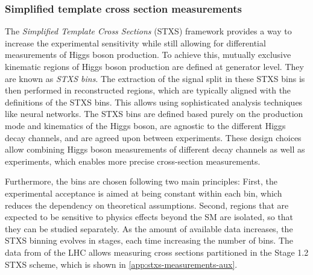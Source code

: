 \subsubsection{Simplified template cross section measurements}
The \emph{Simplified Template Cross Sections} (STXS) framework provides a way to increase the experimental sensitivity while still allowing for differential measurements of Higgs boson production.
To achieve this, mutually exclusive kinematic regions of Higgs boson production are defined at generator level. They are known as \emph{STXS bins}. 
The extraction of the signal split in these STXS bins is then performed in reconstructed regions, which are typically aligned with the definitions of the STXS bins. This allows using sophisticated analysis techniques like neural networks.
The STXS bins are defined based purely on the production mode and kinematics of the Higgs boson, are agnostic to the different Higgs decay channels, and are agreed upon between experiments.
These design choices allow combining Higgs boson measurements of different decay channels as well as experiments, which enables more precise cross-section measurements.

Furthermore, the bins are chosen following two main principles: First, the experimental acceptance is aimed at being constant within each bin, which reduces the dependency on theoretical assumptions. Second, regions that are expected to be sensitive to physics effects beyond the SM are isolated, so that they can be studied separately.
As the amount of available data increases, the STXS binning evolves in stages, each time increasing the number of bins. 
The data from \RunTwo of the LHC allows measuring cross sections partitioned in the Stage 1.2 STXS scheme, which is shown in \cref{app:stxs-measurements-aux}.

